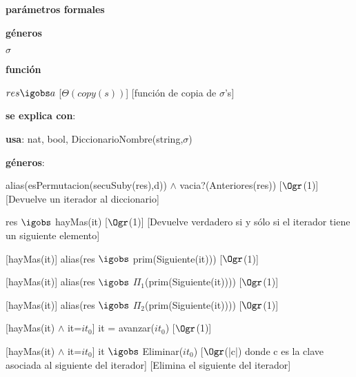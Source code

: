 \begin{Interfaz}

	\textbf{parámetros formales}\parindent\\
	\parbox{1.7cm}{\textbf{géneros}} $\sigma$\\
	\parbox[t]{1.7cm}{\textbf{función}}\parbox[t]{\textwidth-2\parindent-1.7cm}{%
	    	{$res \igobs a$}
		[$\Theta(copy(s))$]
		[función de copia de $\sigma$'s]
	}
	
	\textbf{se explica con}: 
	
	\textbf{usa}: nat, bool, DiccionarioNombre(string,$\sigma$)
	
	\textbf{géneros}: 
	
	
	{alias(esPermutacion(secuSuby(res),d)) $\land$ vacia?(Anteriores(res))}
	[$\Ogr$(1)]
	[Devuelve un iterador al diccionario]
	
	{res $\igobs$ hayMas(it)}	
	[$\Ogr$(1)]
	[Devuelve verdadero si y sólo si el iterador tiene un siguiente elemento]
	
	[hayMas(it)]
	{alias(res $\igobs$ prim(Siguiente(it)))}
	[$\Ogr$(1)]
	
	[hayMas(it)]
	{alias(res $\igobs$ $\Pi_1$(prim(Siguiente(it))))}
	[$\Ogr$(1)]
	
	[hayMas(it)]
	{alias(res $\igobs$ $\Pi_2$(prim(Siguiente(it))))}
	[$\Ogr$(1)]
		
	[hayMas(it) $\land$ it=$it_0$]
	{it = avanzar($it_0$)}	
	[$\Ogr$(1)]
	
	[hayMas(it) $\land$ it=$it_0$]
	{it $\igobs$ Eliminar($it_0$)}
	[$\Ogr$(|c|) donde c es la clave asociada al siguiente del iterador]
	[Elimina el siguiente del iterador]


\end{Interfaz}

